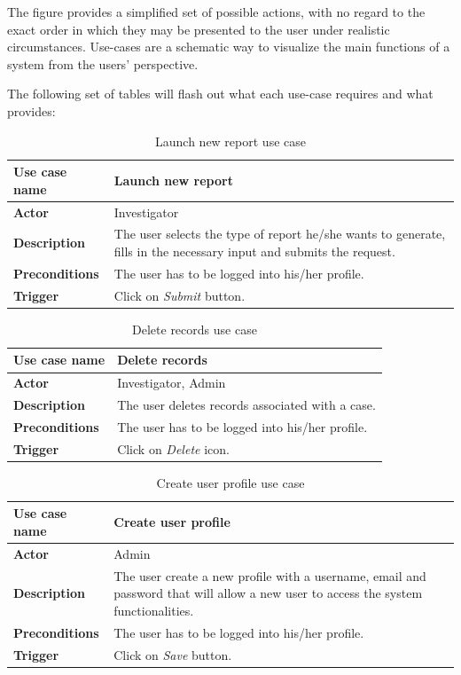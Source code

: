 The figure provides a simplified set of possible actions, with no regard to the
exact order in which they may be presented to the user under realistic
circumstances. Use-cases are a schematic way to visualize the main functions of a
system from the users' perspective.

The following set of tables will flash out what each use-case requires and what
provides:

\begin{table}[H]
\centering
\begin{tabular}{l p{9cm}}  
\toprule
\bf{Use case name}    & Launch new report \\
\midrule
\bf{Actor}    & Investigator \\
\midrule
\bf{Description}    & The user selects the type of report he/she wants to
generate, fills in the necessary input and submits the request. \\
\midrule
\bf{Preconditions}    & The user has to be logged into his/her profile. \\
\midrule
\bf{Trigger}    & Click on \emph{Submit} button. \\
\bottomrule
\end{tabular}
\caption{Launch new report use case}
\end{table}

\begin{table}[H]
\centering
\begin{tabular}{l p{9cm}}  
\toprule
\bf{Use case name}    & Delete records \\
\midrule
\bf{Actor}    & Investigator, Admin \\
\midrule
\bf{Description}    & The user deletes records associated with a case. \\
\midrule
\bf{Preconditions}    & The user has to be logged into his/her profile. \\
\midrule
\bf{Trigger}    & Click on \emph{Delete} icon. \\
\bottomrule
\end{tabular}
\caption{Delete records use case}
\end{table}

\begin{table}[H]
\centering
\begin{tabular}{l p{9cm}}  
\toprule
\bf{Use case name}    & Create user profile \\
\midrule
\bf{Actor}    & Admin \\
\midrule
\bf{Description}    & The user create a new profile with a username, email and
password that will allow a new user to access the system functionalities.
\\
\midrule
\bf{Preconditions}    & The user has to be logged into his/her profile. \\
\midrule
\bf{Trigger}    & Click on \emph{Save} button. \\
\bottomrule
\end{tabular}
\caption{Create user profile use case}
\end{table}

